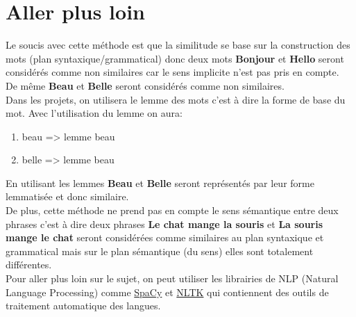 \documentclass[a4paper, 14pt]{article}
\begin{document}
    \section{Aller plus loin}
    Le soucis avec cette méthode est que la similitude se base sur la construction des mots (plan syntaxique/grammatical) donc deux mots \textbf{Bonjour} et \textbf{Hello} seront considérés comme non similaires car le sens implicite n'est pas pris en compte.\\
    De même \textbf{Beau} et \textbf{Belle} seront considérés comme non similaires.\\
    Dans les projets, on utilisera le lemme des mots c'est à dire la forme de base du mot. Avec l'utilisation du lemme on aura:
    \begin{enumerate}
    	\item[\textbullet] beau => lemme beau
    	\item[\textbullet] belle => lemme beau
    \end{enumerate}
    En utilisant les lemmes \textbf{Beau} et \textbf{Belle} seront représentés par leur forme lemmatisée et donc similaire.\\
    De plus, cette méthode ne prend pas en compte le sens sémantique entre deux phrases c'est à dire deux phrases \textbf{Le chat mange la souris} et \textbf{La souris mange le chat} seront considérées comme similaires au plan syntaxique et grammatical mais sur le plan sémantique (du sens) elles sont totalement différentes.\\
    Pour aller plus loin sur le sujet, on peut utiliser les librairies de NLP (Natural Language Processing) comme \href{https://spacy.io/}{SpaCy} et \href{https://www.nltk.org/}{NLTK} qui contiennent des outils de traitement automatique des langues.
\end{document}
